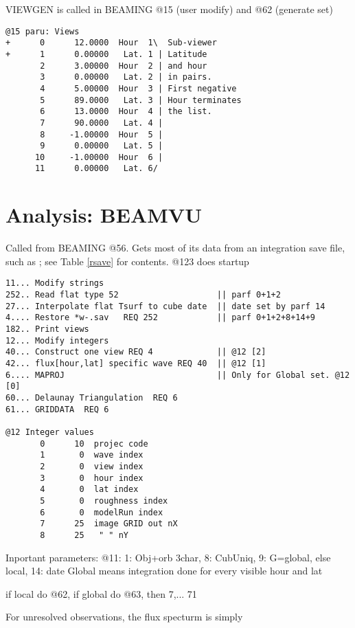 \documentclass{article}
\begin{document}
VIEWGEN is called in BEAMING @15 (user modify) and @62 (generate set)

\vspace{-3.mm} 
\begin{verbatim}
@15 paru: Views                  
+      0      12.0000  Hour  1\  Sub-viewer
+      1      0.00000   Lat. 1 | Latitude
       2      3.00000  Hour  2 | and hour
       3      0.00000   Lat. 2 | in pairs.
       4      5.00000  Hour  3 | First negative
       5      89.0000   Lat. 3 | Hour terminates
       6      13.0000  Hour  4 | the list.
       7      90.0000   Lat. 4 | 
       8     -1.00000  Hour  5 | 
       9      0.00000   Lat. 5 | 
      10     -1.00000  Hour  6 | 
      11      0.00000   Lat. 6/
\end{verbatim}  
 
 
\section{Analysis: BEAMVU } 
 Called from BEAMING @56. Gets most of its data from an integration save file, such as ; see Table \ref{rsave} for contents.  @123 does startup 
\vspace{-3.mm} 
\begin{verbatim}
11... Modify strings
252.. Read flat type 52                    || parf 0+1+2
27... Interpolate flat Tsurf to cube date  || date set by parf 14
4.... Restore *w-.sav   REQ 252            || parf 0+1+2+8+14+9
182.. Print views
12... Modify integers
40... Construct one view REQ 4             || @12 [2]
42... flux[hour,lat] specific wave REQ 40  || @12 [1]
6.... MAPROJ                               || Only for Global set. @12 [0] 
60... Delaunay Triangulation  REQ 6
61... GRIDDATA  REQ 6

@12 Integer values
       0      10  projec code
       1       0  wave index
       2       0  view index
       3       0  hour index
       4       0  lat index
       5       0  roughness index
       6       0  modelRun index
       7      25  image GRID out nX
       8      25   " " nY
\end{verbatim} 
Inportant parameters:
\qi @11:  1: Obj+orb 3char, 8: CubUniq, 9: G=global, else local,  14: date 
\qii Global means integration done for every visible hour and lat

 if local do @62, if global do @63, then 7,... 71

For unresolved observations, the flux specturm is simply 
\end{document}
